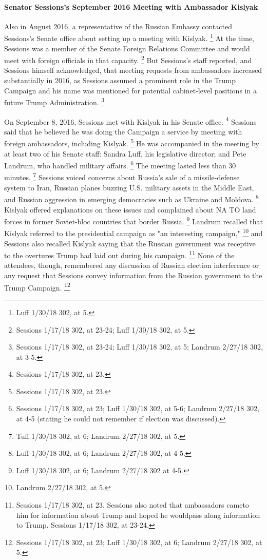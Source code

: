 \paragraph{Senator Sessions's September 2016 Meeting with Ambassador Kislyak}

Also in August 2016, a representative of the Russian Embassy contacted Sessions's Senate office about setting up a meeting with Kislyak.%
\footnote{Luff 1/30/18 302, at 5.}
At the time, Sessions was a member of the Senate Foreign Relations Committee and would meet with foreign officials in that capacity.%
\footnote{Sessions 1/17/18 302, at 23-24;
Luff 1/30/18 302, at 5.}
But Sessions's staff reported, and Sessions himself acknowledged, that meeting requests from ambassadors increased substantially in 2016, as Sessions assumed a prominent role in the Trump Campaign and his name was mentioned for potential cabinet-level positions in a future Trump Administration.%
\footnote{Sessions 1/17/18 302, at 23-24;
Luff 1/30/18 302, at 5;
Landrum 2/27/18 302, at 3-5.}

On September 8, 2016, Sessions met with Kislyak in his Senate office.%
\footnote{Sessions 1/17/18 302, at 23.}
Sessions said that he believed he was doing the Campaign a service by meeting with foreign ambassadors, including Kislyak.%
\footnote{Sessions 1/17/18 302, at 23.}
He was accompanied in the meeting by at least two of his Senate staff: Sandra Luff, his legislative director; and Pete Landrum, who handled military affairs.%
\footnote{Sessions 1/17/18 302, at 23;
Luff 1/30/18 302, at 5-6;
Landrum 2/27/18 302, at 4-5 (stating he could not remember if election was discussed).}
The meeting lasted less than 30 minutes.%
\footnote{Tuff 1/30/18 302, at 6;
Landrum 2/27/18 302, at 5.}
Sessions voiced concerns about Russia's sale of a missile-defense system to Iran, Russian planes buzzing U.S. military assets in the Middle East, and Russian aggression in emerging democracies such as Ukraine and Moldova.%
\footnote{Luff 1/30/18 302, at 6;
Landrum 2/27/18 302, at 4-5.}
Kislyak offered explanations on these issues and complained about NA TO land forces in former Soviet-bloc countries that border Russia.%
\footnote{Luff 1/30/18 302, at 6;
Landrum 2/27/18 302 at 4-5.}
Landrum recalled that Kislyak referred to the presidential campaign as "an interesting campaign,"%
\footnote{Landrum 2/27/18 302, at 5.}
and Sessions also recalled Kislyak saying that the Russian government was receptive to the overtures Trump had laid out during his campaign.%
\footnote{Sessions 1/17/18 302, at 23.
Sessions also noted that ambassadors cameto him for information about Trump and hoped he wouldpass along information to Trump.
Sessions 1/17/18 302, at 23-24.}
None of the attendees, though, remembered any discussion of Russian election interference or any request that Sessions convey information from the Russian government to the Trump Campaign.%
\footnote{Sessions 1/17/18 302, at 23;
Luff 1/30/18 302, at 6;
Landrum 2/27/18 302, at 5.}

